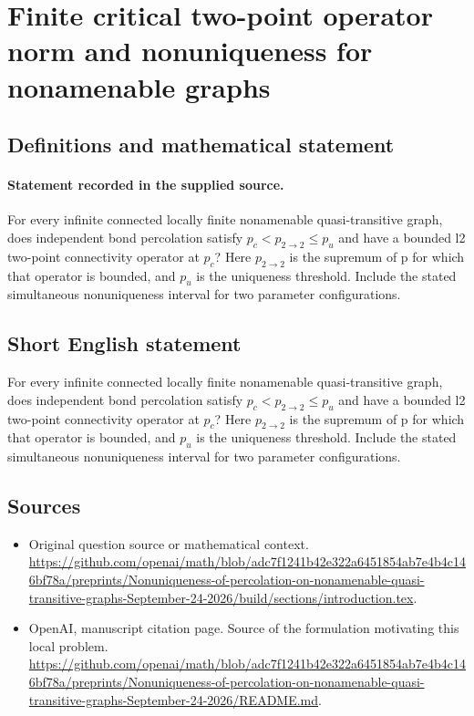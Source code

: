 \documentclass[11pt]{article}
\begin{document}
\section*{Finite critical two-point operator norm and nonuniqueness for nonamenable graphs}\label{30007376}
\subsection{Definitions and mathematical statement}
\paragraph{Statement recorded in the supplied source.}
For every infinite connected locally finite nonamenable quasi-transitive graph, does independent bond percolation satisfy $p_c<p_{2\to 2}\leq p_u$ and have a bounded l2 two-point connectivity operator at $p_c$? Here $p_{2\to 2}$ is the supremum of p for which that operator is bounded, and $p_u$ is the uniqueness threshold. Include the stated simultaneous nonuniqueness interval for two parameter configurations.
\subsection{Short English statement}
For every infinite connected locally finite nonamenable quasi-transitive graph, does independent bond percolation satisfy $p_c<p_{2\to 2}\leq p_u$ and have a bounded l2 two-point connectivity operator at $p_c$? Here $p_{2\to 2}$ is the supremum of p for which that operator is bounded, and $p_u$ is the uniqueness threshold. Include the stated simultaneous nonuniqueness interval for two parameter configurations.
\subsection{Sources}
\begin{itemize}
\item[S1] Original question source or mathematical context.
\url{https://github.com/openai/math/blob/adc7f1241b42e322a6451854ab7e4b4c146bf78a/preprints/Nonuniqueness-of-percolation-on-nonamenable-quasi-transitive-graphs-September-24-2026/build/sections/introduction.tex}.
\item[S2] OpenAI, manuscript citation page. Source of the formulation motivating this local problem.
\url{https://github.com/openai/math/blob/adc7f1241b42e322a6451854ab7e4b4c146bf78a/preprints/Nonuniqueness-of-percolation-on-nonamenable-quasi-transitive-graphs-September-24-2026/README.md}.
\end{itemize}
\end{document}

